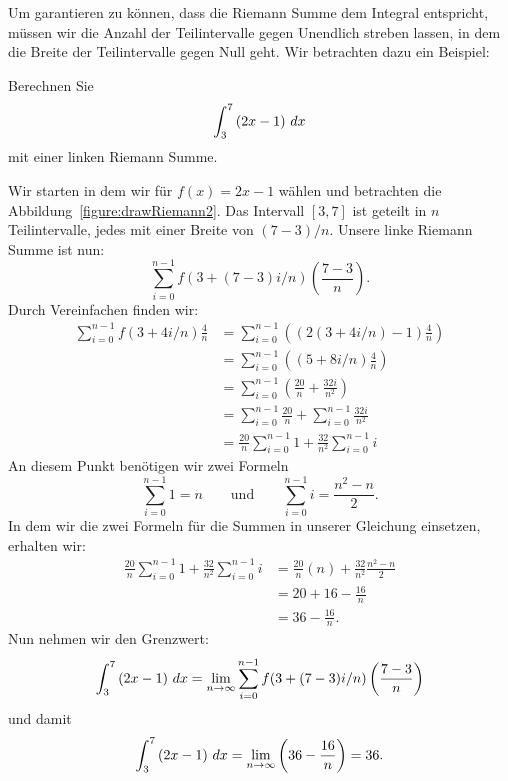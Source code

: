 Um garantieren zu können, dass die Riemann Summe dem Integral entspricht, müssen wir die Anzahl der Teilintervalle gegen Unendlich streben lassen, in dem die Breite der Teilintervalle gegen Null geht. Wir betrachten dazu ein Beispiel:

\begin{example}
Berechnen Sie
\[
\int_3^7 \left(2x-1\right)\, d x
\]
mit einer linken Riemann Summe.
\end{example}

\begin{solution}
Wir starten in dem wir für $f(x) = 2x-1$ wählen und betrachten die Abbildung~\ref{figure:drawRiemann2}.  Das Intervall $[3,7]$ ist geteilt in $n$ Teilintervalle, jedes mit einer Breite von $(7-3)/n$. Unsere linke Riemann Summe ist nun:
\[
\sum_{i=0}^{n-1} f(3+(7-3)i/n) \left(\frac{7-3}{n}\right).
\]
Durch Vereinfachen finden wir:
\begin{align*}
\sum_{i=0}^{n-1} f(3+4i/n) \frac{4}{n} &= \sum_{i=0}^{n-1} \left((2(3+4i/n) -1 )\frac{4}{n}\right)\\
&= \sum_{i=0}^{n-1} \left((5+8i/n )\frac{4}{n}\right)\\
&= \sum_{i=0}^{n-1} \left(\frac{20}{n} + \frac{32i}{n^2}\right)\\
&= \sum_{i=0}^{n-1} \frac{20}{n} + \sum_{i=0}^{n-1}\frac{32i}{n^2}\\
&= \frac{20}{n}\sum_{i=0}^{n-1} 1 +\frac{32}{n^2} \sum_{i=0}^{n-1} i
\end{align*}
An diesem Punkt benötigen wir zwei Formeln
\[
\sum_{i=0}^{n-1}1 = n \qquad\text{und}\qquad \sum_{i=0}^{n-1} i = \frac{n^2-n}{2}.
\]
In dem wir die zwei Formeln für die Summen in unserer Gleichung einsetzen, erhalten wir:
\begin{align*}
\frac{20}{n}\sum_{i=0}^{n-1} 1 +\frac{32}{n^2} \sum_{i=0}^{n-1} i &=\frac{20}{n}(n) +\frac{32}{n^2}\frac{n^2-n}{2}\\
&=20+16 -\frac{16}{n}\\
&=36 - \frac{16}{n}.
\end{align*}
Nun nehmen wir den Grenzwert:
\[
\int_3^7 \left(2x-1\right) \, d x = \lim_{n\to \infty}\sum_{i=0}^{n-1} f(3+(7-3)i/n) \left(\frac{7-3}{n}\right)
\]
und damit
\[
\int_3^7 \left(2x-1 \right)\, d x = \lim_{n\to \infty} \left(36 - \frac{16}{n}\right) = 36.
\]
\end{solution}

